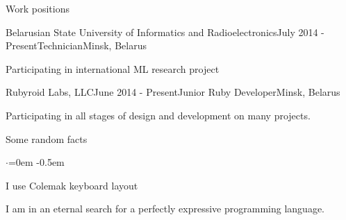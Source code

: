 \documentclass{resume} %
\begin{document}

\begin{rSection}{Work positions}

\begin{rSubsection}{Belarusian State University of Informatics and Radioelectronics}{July 2014 - Present}{Technician}{Minsk, Belarus}
\item Participating in international ML research project
\end{rSubsection}

\begin{rSubsection}{Rubyroid Labs, LLC}{June 2014 - Present}{Junior Ruby Developer}{Minsk, Belarus}
\item Participating in all stages of design and development on many projects.
\end{rSubsection}

\end{rSection}


\begin{rSection}{Some random facts}
  \smallskip
  \begin{list}{$\cdot$}{\leftmargin=0em} %
    \itemsep -0.5em \vspace{-0.3em} %
  \item I use Colemak keyboard layout
  \item I am in an eternal search for a perfectly expressive programming language.
  \end{list}
\end{rSection}


%
%
%
%
\end{document}
